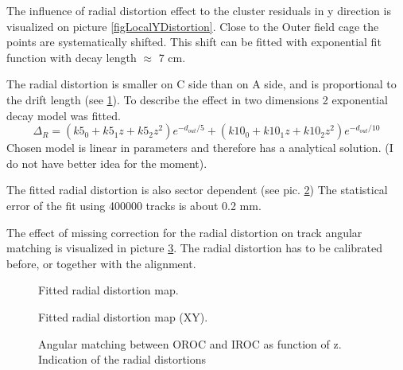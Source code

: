 \documentclass{elsart}
\begin{document}
The influence of radial distortion effect to the cluster residuals in y direction is visualized on picture \ref{figLocalYDistortion}.
Close to the Outer field cage the points are systematically shifted. This shift can be
fitted with exponential fit function with decay length $\approx$ 7 cm.
 
The radial distortion is smaller on C side than on A side, and is proportional to the drift length (see \ref{figRadialDistortionMapDZ}).
To describe the effect in two dimensions 2 exponential decay model was fitted.
\begin{equation}
\Delta_R=(k5_0+k5_1z+k5_2z^2)e^{-d_{out}/5}+(k10_0+k10_1z+k10_2z^2)e^{-d_{out}/10}
\end{equation}
Chosen model is linear in parameters and therefore has a analytical solution.
(I do not have better idea for the moment). 

The fitted radial distortion is also sector  dependent (see pic. \ref{figRadialDistortionMapXY})
The statistical error of the fit using 400000 tracks is about 0.2 mm.




The effect of missing correction for the radial distortion on track angular matching is visualized in picture \ref{figAngularAlignRdist}. The radial distortion has to be calibrated before, or together with the alignment. 




\begin{figure}
  \centering{}
  \caption{Fitted radial distortion map.}
  \label{figRadialDistortionMapDZ}
\end{figure}

\begin{figure}
  \centering{}
  \centering{}
  \caption{Fitted radial distortion map (XY).}
  \label{figRadialDistortionMapXY}
\end{figure}



\begin{figure}
  \centering{}
  \centering{}
  \caption{Angular matching between OROC and IROC as function of z. Indication of the radial 
           distortions }
  \label{figAngularAlignRdist}
\end{figure}
\end{document}
